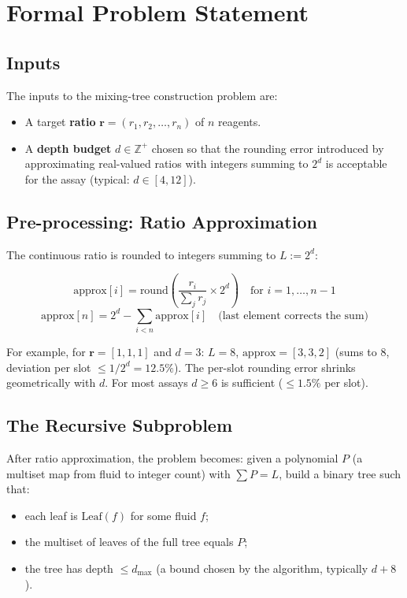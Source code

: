 \section{Formal Problem Statement}
\label{sec:formal}

\subsection{Inputs}

The inputs to the mixing-tree construction problem are:
\begin{itemize}
    \item A target \textbf{ratio} $\mathbf{r} = (r_1, r_2, \ldots, r_n)$ of $n$ reagents.
    \item A \textbf{depth budget} $d \in \mathbb{Z}^+$ chosen so that the rounding error introduced by approximating real-valued ratios with integers summing to $2^d$ is acceptable for the assay (typical: $d \in [4, 12]$).
\end{itemize}

\subsection{Pre-processing: Ratio Approximation}

The continuous ratio is rounded to integers summing to $L := 2^d$:

\begin{equation}
\text{approx}[i] = \text{round}\left(\frac{r_i}{\sum_j r_j} \times 2^d\right) \quad \text{for } i = 1, \ldots, n-1
\end{equation}
\begin{equation}
\text{approx}[n] = 2^d - \sum_{i<n} \text{approx}[i] \quad \text{(last element corrects the sum)}
\end{equation}

For example, for $\mathbf{r} = [1, 1, 1]$ and $d = 3$: $L = 8$, $\text{approx} = [3, 3, 2]$ (sums to 8, deviation per slot $\leq 1/2^d = 12.5\%$). The per-slot rounding error shrinks geometrically with $d$. For most assays $d \geq 6$ is sufficient ($\leq 1.5\%$ per slot).

\subsection{The Recursive Subproblem}

After ratio approximation, the problem becomes: given a polynomial $P$ (a multiset map from fluid to integer count) with $\sum P = L$, build a binary tree such that:
\begin{itemize}
    \item each leaf is $\text{Leaf}(f)$ for some fluid $f$;
    \item the multiset of leaves of the full tree equals $P$;
    \item the tree has depth $\leq d_{\max}$ (a bound chosen by the algorithm, typically $d + 8$).
\end{itemize}

